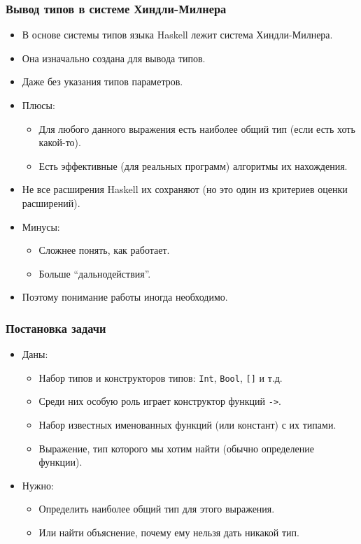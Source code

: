 \documentclass[11pt]{beamer}
\begin{document}
\begin{frame}[fragile]
\frametitle{Вывод типов в системе Хиндли-Милнера}
\begin{itemize}
    \item В основе системы типов языка Haskell лежит система Хиндли-Милнера.
    \item Она изначально создана для вывода типов.
    \pause
    \item Даже без указания типов параметров.
    \pause
    \item Плюсы: 
    \begin{itemize}
        \pause
        \item Для любого данного выражения есть наиболее общий тип (если есть хоть какой-то).
        \pause
        \item Есть эффективные (для реальных программ) алгоритмы их нахождения.
    \end{itemize}
    \pause
    \item Не все расширения Haskell их сохраняют (но это один из критериев оценки расширений).
    \pause
    \item Минусы:
    \begin{itemize}
        \pause
        \item Сложнее понять, как работает.
        \pause
        \item Больше \enquote{дальнодействия}.
    \end{itemize}
    \pause
    \item Поэтому понимание работы иногда необходимо.
\end{itemize}
\end{frame}

\begin{frame}[fragile]
\frametitle{Постановка задачи}
\begin{itemize}
    \item Даны:
    \begin{itemize}
        \item Набор типов и конструкторов типов: \lstinline|Int|, \lstinline|Bool|, \lstinline|[]| и т.д.
        \item Среди них особую роль играет конструктор функций \lstinline|->|.
        \item Набор известных именованных функций (или констант) с их типами.
        \item Выражение, тип которого мы хотим найти (обычно определение функции).
    \end{itemize}
    \pause
    \item Нужно: 
    \begin{itemize}
        \item Определить наиболее общий тип для этого выражения.
        \pause
        \item Или найти объяснение, почему ему нельзя дать никакой тип.
    \end{itemize}
\end{itemize}
\end{frame}
\end{document}
